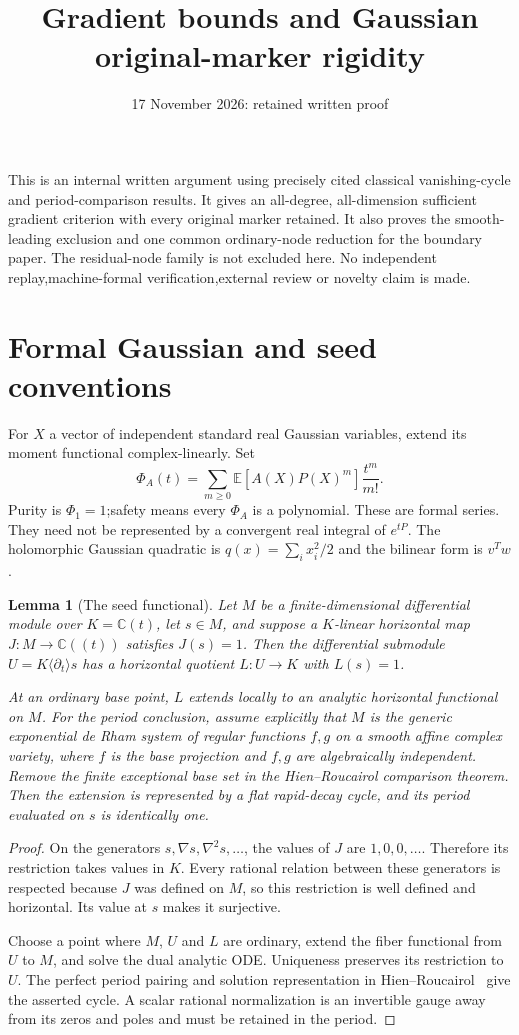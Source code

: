 \documentclass[11pt]{article}
\title{Gradient bounds and Gaussian original-marker rigidity}
\author{}\date{17 November 2026: retained written proof}
\newtheorem{lemma}[theorem]{Lemma}
\theoremstyle{definition}\newtheorem{definition}[theorem]{Definition}
\theoremstyle{remark}\newtheorem{remark}[theorem]{Remark}
\newcommand{\E}{\mathbb E}
\newcommand{\C}{\mathbb C}
\begin{document}
\maketitle
This is an internal written argument using precisely cited classical
vanishing-cycle and period-comparison results. It gives an all-degree,
all-dimension sufficient gradient criterion with every original marker
retained. It also proves the smooth-leading exclusion and one common
ordinary-node reduction for the boundary paper. The residual-node
family is not excluded here. No independent replay,machine-formal
verification,external review or novelty claim is made.

\section{Formal Gaussian and seed conventions}
For $X$ a vector of independent standard real Gaussian variables,
extend its moment functional complex-linearly. Set
\[
 \Phi_A(t)=\sum_{m\geq0}\E[A(X)P(X)^m]\frac{t^m}{m!}.
\]
Purity is $\Phi_1=1$;safety means every $\Phi_A$ is a polynomial.
These are formal series. They need not be represented by a convergent
real integral of $e^{tP}$. The holomorphic Gaussian quadratic is
$q(x)=\sum_i x_i^2/2$ and the bilinear form is $v^Tw$.

\begin{lemma}[The seed functional]\label{lem:seedfunctional}
Let $M$ be a finite-dimensional differential module over $K=\C(t)$,
let $s\in M$, and suppose a $K$-linear horizontal map
$J:M\longrightarrow\C((t))$ satisfies $J(s)=1$. Then the differential
submodule $U=K\langle\partial_t\rangle s$ has a horizontal quotient
$L:U\longrightarrow K$ with $L(s)=1$.

At an ordinary base point, $L$ extends locally to an analytic horizontal
functional on $M$. For the period conclusion, assume explicitly that
$M$ is the generic exponential de Rham system of regular functions
$f,g$ on a smooth affine complex variety, where $f$ is the base
projection and $f,g$ are algebraically independent. Remove the finite
exceptional base set in the Hien--Roucairol comparison theorem.
Then the extension is represented by a flat rapid-decay cycle, and its
period evaluated on $s$ is identically one.
\end{lemma}
\begin{proof}
On the generators $s,\nabla s,\nabla^2s,\ldots$, the values of $J$
are $1,0,0,\ldots$. Therefore its restriction takes values in $K$.
Every rational relation between these generators is respected because
$J$ was defined on $M$, so this restriction is well defined and
horizontal. Its value at $s$ makes it surjective.

Choose a point where $M$, $U$ and $L$ are ordinary, extend the fiber
functional from $U$ to $M$, and solve the dual analytic ODE.
Uniqueness preserves its restriction to $U$. The perfect period
pairing and solution representation in
Hien--Roucairol~\cite[Theorems~2.4 and~3.7]{HienRoucairol} give the
asserted cycle. A scalar rational normalization is an invertible gauge
away from its zeros and poles and must be retained in the period.
\end{proof}
\end{document}

